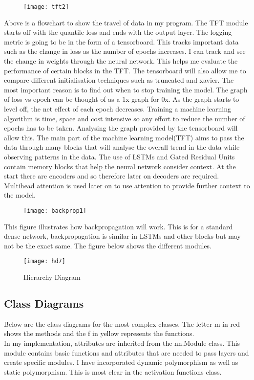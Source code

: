 \documentclass{article}
\begin{document}
\begin{figure}[H]
    \centering
    \texttt{[image: tft2]}
    \caption{}
\end{figure}

Above is a flowchart to show the travel of data in my program. The TFT module starts off with the quantile loss and ends with the output layer.
The logging metric is going to be in the form of a tensorboard. This tracks important data such as the change in loss as the number of epochs increases. I can track and see the change in weights through the neural network. This helps me evaluate the performance of certain blocks in the TFT. The tensorboard will also allow me to compare different initialisation techniques such as truncated and xavier. The most important reason is to find out when to stop training the model. The graph of loss vs epoch can be thought of as a 1x graph for 0x. As the graph starts to level off, the net effect of each epoch decreases. Training a machine learning algorithm is time, space and cost intensive so any effort to reduce the number of epochs has to be taken. Analysing the graph provided by the tensorboard will allow this.
The main part of the machine learning model(TFT) aims to pass the data through many blocks that will analyse the overall trend in the data while observing patterns in the data. The use of LSTMs and Gated Residual Units contain memory blocks that help the neural network consider context. At the start there are encoders and so therefore later on decoders are required. Multihead attention is used later on to use attention to provide further context to the model.

\begin{figure}[H]
    \centering
    \texttt{[image: backprop1]}
    \caption{}
\end{figure}

This figure illustrates how backpropagation will work. This is for a standard dense network, backpropagation is similar in LSTMs and other blocks but may not be the exact same.
The figure below shows the different modules.
\begin{figure}[H]
    \centering
    \texttt{[image: hd7]}
    \caption{Hierarchy Diagram}
\end{figure}
\clearpage
\subsection{Class Diagrams}
Below are the class diagrams for the most complex classes. The letter m in red shows the methods and the f in yellow represents the functions.\\
In my implementation, attributes are inherited from the nn.Module class. This module contains basic functions and attributes that are needed to pass
layers and create specific modules. I have incorporated dynamic polymorphism as well as static polymorphism. This is most clear in the activation functions
class.
\end{document}
